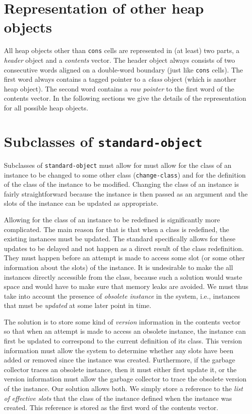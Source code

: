 \section{Representation of other heap objects}

All heap objects other than \texttt{cons} cells are represented in (at
least) two parts, a \emph{header} object and a \emph{contents} vector.
The header object always consists of two consecutive words aligned on
a double-word boundary (just like \texttt{cons} cells).  The first
word always contains a tagged pointer to a \emph{class} object (which
is another heap object).  The second word contains a \emph{raw
  pointer} to the first word of the contents vector.  In the following
sections we give the details of the representation for all possible
heap objects.

\section{Subclasses of \texttt{standard-object}}

Subclasses of \texttt{standard-object} must allow for must allow for
the class of an instance to be changed to some other class
(\texttt{change-class}) and for the definition of the class of the
instance to be modified.  Changing the class of an instance is fairly
straightforward because the instance is then passed as an argument and
the slots of the instance can be updated as appropriate.

Allowing for the class of an instance to be redefined is significantly
more complicated.  The main reason for that is that when a class is
redefined, the existing instances must be updated.  The standard
specifically allows for these updates to be delayed and not happen as
a direct result of the class redefinition.  They must happen before an
attempt is made to access some slot (or some other information about
the slots) of the instance.  It is undesirable to make the all
instances directly accessible from the class, because such a solution
would waste space and would have to make sure that memory leaks are
avoided.  We must thus take into account the presence of
\emph{obsolete instance} in the system, i.e., instances that must be
\emph{updated} at some later point in time. 

The solution is to store some kind of \emph{version} information in
the contents vector so that when an attempt is made to access an
obsolete instance, the instance can first be updated to correspond to
the current definition of its class.  This version information must
allow the system to determine whether any slots have been added or
removed since the instance was created.  Furthermore, if the garbage
collector traces an obsolete instance, then it must either first
update it, or the version information must allow the garbage collector
to trace the obsolete version of the instance.  Our solution allows
both.  We simply store a reference to the \emph{list of effective
  slots} that the class of the instance defined when the instance was
created.  This reference is stored as the first word of the contents
vector.  

